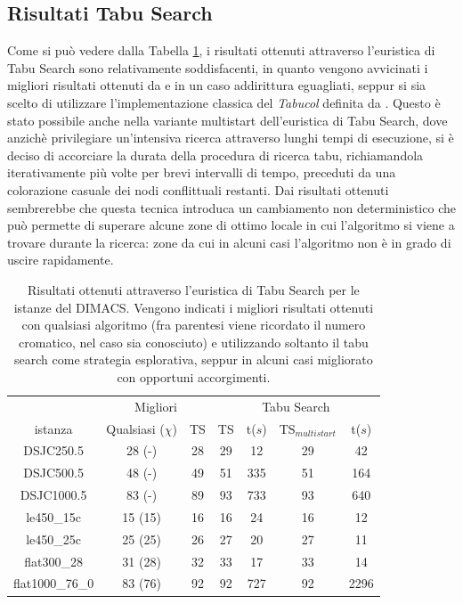 \documentclass[a4paper,10pt]{article}
\newcommand{\tabucol}{\emph{Tabucol}}
\begin{document}
\subsection{Risultati Tabu Search}
Come si può vedere dalla Tabella \ref{tab:tabu}, i risultati ottenuti attraverso l'euristica di Tabu Search sono relativamente soddisfacenti, in quanto vengono avvicinati i migliori risultati ottenuti da \cite{tabucolimproved} e in un caso addirittura eguagliati, seppur si sia scelto di utilizzare l'implementazione classica del \tabucol{} definita da \cite{tabucol}. Questo è stato possibile anche nella variante multistart dell'euristica di Tabu Search, dove anzichè privilegiare un'intensiva ricerca attraverso lunghi tempi di esecuzione, si è deciso di accorciare la durata della procedura di ricerca tabu, richiamandola iterativamente più volte per brevi intervalli di tempo, preceduti da una colorazione casuale dei nodi conflittuali restanti. Dai risultati ottenuti sembrerebbe che questa tecnica introduca un cambiamento non deterministico che può permette di superare alcune zone di ottimo locale in cui l'algoritmo si viene a trovare durante la ricerca: zone da cui in alcuni casi l'algoritmo non è in grado di uscire rapidamente.

\begin{table}[h]
\begin{center}
\begin{tabular}{|c|c|c||c|c|c|c|}
\hline
                & \multicolumn{2}{c||}{Migliori} & \multicolumn{4}{c|}{Tabu Search} \\
\cline{2-7}
istanza         &Qualsiasi ($\chi$)    &TS   &TS        &t($s$)     &$\textrm{TS}_{multistart}$  &t($s$)\\
\hline
DSJC250.5       & 28 (-)               & 28  &29        &12         &29             &42 \\
DSJC500.5       & 48 (-)               & 49  &51        &335        &51             &164 \\
DSJC1000.5      & 83 (-)               & 89  &93        &733        &93             &640 \\
le450\_15c      & 15 (15)              & 16  &16        &24         &16             &12 \\
le450\_25c      & 25 (25)              & 26  &27        &20         &27             &11 \\
flat300\_28     & 31 (28)              & 32  &33        &17         &33             &14 \\
flat1000\_76\_0 & 83 (76)              & 92  &92        &727        &92             &2296 \\
\hline
\end{tabular}
\caption{Risultati ottenuti attraverso l'euristica di Tabu Search per le istanze del DIMACS. Vengono indicati i migliori risultati ottenuti con qualsiasi algoritmo (fra parentesi viene ricordato il numero cromatico, nel caso sia conosciuto) e utilizzando soltanto il tabu search come strategia esplorativa, seppur in alcuni casi \cite{tabucolimproved} migliorato con opportuni accorgimenti.}
\label{tab:tabu}
\end{center}
\end{table}
\end{document}
